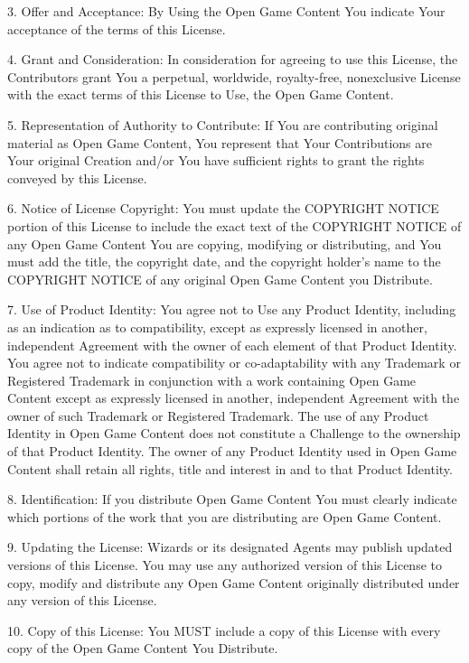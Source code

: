 \documentclass[letter,10pt,twocolumn,openany]{dndbook}
\begin{document}
3. Offer and Acceptance: By Using the Open Game Content You indicate Your acceptance of the terms of this License.

4. Grant and Consideration: In consideration for agreeing to use this License, the Contributors grant You a perpetual, worldwide, royalty-free, nonexclusive License with the exact terms of this License to Use, the Open Game Content.

5. Representation of Authority to Contribute: If You are contributing original material as Open Game Content, You represent that Your Contributions are Your original Creation and/or You have sufficient rights to grant the rights conveyed by this License.

6. Notice of License Copyright: You must update the COPYRIGHT NOTICE portion of this License to include the exact text of the COPYRIGHT NOTICE of any Open Game Content You are copying, modifying or distributing, and You must add the title, the copyright date, and the copyright holder’s name to the COPYRIGHT NOTICE of any original Open Game Content you Distribute.

7. Use of Product Identity: You agree not to Use any Product Identity, including as an indication as to compatibility, except as expressly licensed in another, independent Agreement with the owner of each element of that Product Identity. You agree not to indicate compatibility or co-adaptability with any Trademark or Registered Trademark in conjunction with a work containing Open Game Content except as expressly licensed in another, independent Agreement with the owner of such Trademark or Registered Trademark. The use of any Product Identity in Open Game Content does not constitute a Challenge to the ownership of that Product Identity. The owner of any Product Identity used in Open Game Content shall retain all rights, title and interest in and to that Product Identity.

8. Identification: If you distribute Open Game Content You must clearly indicate which portions of the work that you are distributing are Open Game Content.

9. Updating the License: Wizards or its designated Agents may publish updated versions of this License. You may use any authorized version of this License to copy, modify and distribute any Open Game Content originally distributed under any version of this License.

10. Copy of this License: You MUST include a copy of this License with every copy of the Open Game Content You Distribute.
\end{document}
